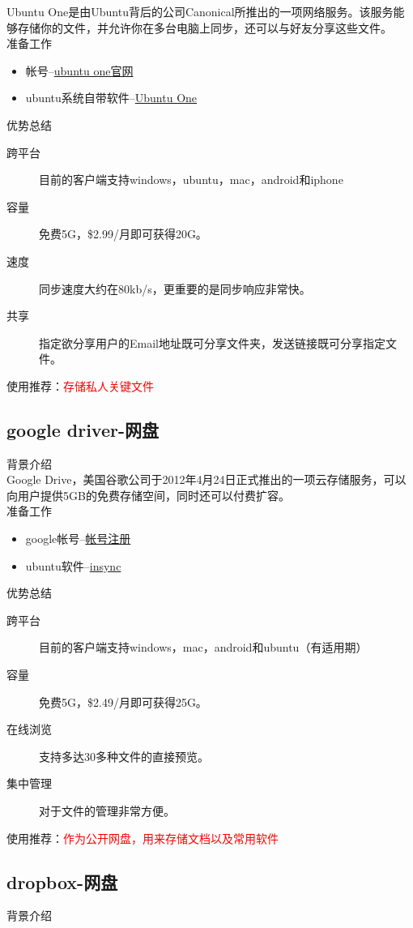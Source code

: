 Ubuntu One是由Ubuntu背后的公司Canonical所推出的一项网络服务。该服务能够存储你的文件，并允许你在多台电脑上同步，还可以与好友分享这些文件。\\
准备工作
\begin{itemize}
\item 帐号--\href{https://one.ubuntu.com/dashboard}{ubuntu one官网}
\item ubuntu系统自带软件--\href{https://one.ubuntu.com/downloads/ubuntu}{Ubuntu One}
\end{itemize} 
优势总结
\begin{description}
\item[跨平台] 目前的客户端支持windows，ubuntu，mac，android和iphone
\item[容量] 免费5G，\$2.99/月即可获得20G。
\item[速度] 同步速度大约在80kb/s，更重要的是同步响应非常快。
\item[共享] 指定欲分享用户的Email地址既可分享文件夹，发送链接既可分享指定文件。
\end{description}
使用推荐：\textcolor{red}{存储私人关键文件}

\subsection{google driver-网盘}
背景介绍\\

Google Drive，美国谷歌公司于2012年4月24日正式推出的一项云存储服务，可以向用户提供5GB的免费存储空间，同时还可以付费扩容。\\
准备工作
\begin{itemize}
\item google帐号--\href{https://accounts.google.com/SignUp?hl=zh-CN}{帐号注册}
\item ubuntu软件--\href{https://www.insynchq.com/linux}{insync}
\end{itemize} 
优势总结
\begin{description}
\item[跨平台] 目前的客户端支持windows，mac，android和ubuntu（有适用期）
\item[容量] 免费5G，\$2.49/月即可获得25G。
\item[在线浏览] 支持多达30多种文件的直接预览。
\item[集中管理] 对于文件的管理非常方便。
\end{description}
使用推荐：\textcolor{red}{作为公开网盘，用来存储文档以及常用软件}


\subsection{dropbox-网盘}
背景介绍\\

